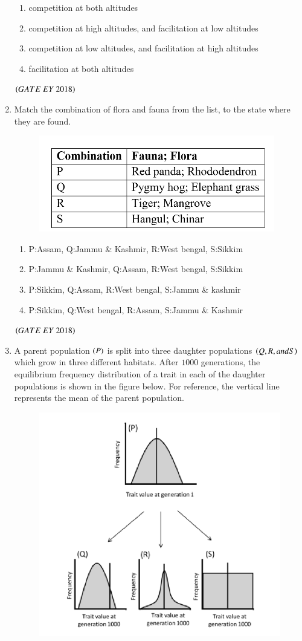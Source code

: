 \documentclass[journal]{IEEEtran}
\numberwithin{equation}{enumi}
\numberwithin{figure}{enumi}
\begin{document}
\begin{enumerate}
\begin{figure}[!ht]
    \caption{}
    \label{fig:3}
   \end{figure}
    \begin{enumerate}
        \item competition at both altitudes
        \item competition at high altitudes, and facilitation at low altitudes
        \item competition at low altitudes, and facilitation at high altitudes
        \item facilitation at both altitudes
    \end{enumerate}
    \hfill{$\brak{ GATE\ EY\ 2018}$}
    \bigskip
    \item Match the combination of flora and fauna from the list, to the state where they are
found.
\begin{figure}[!ht]
    \centering
    \includegraphics[width=0.5\columnwidth]{figs/4.png}
    \caption{}
    \label{fig:4}
   \end{figure}
    \begin{enumerate}
        \item P:Assam, Q:Jammu \& Kashmir, R:West bengal, S:Sikkim
        \item P:Jammu \& Kashmir, Q:Assam, R:West bengal, S:Sikkim
        \item P:Sikkim, Q:Assam, R:West bengal, S:Jammu \& kashmir
        \item P:Sikkim, Q:West bengal, R:Assam, S:Jammu \& Kashmir
    \end{enumerate}
    \hfill{$\brak{ GATE\ EY\ 2018}$}
    \bigskip
    \item A parent population $\left(P\right)$ is split into three daughter populations $\left(Q, R, and S\right)$ which
grow in three different habitats. After $1000$ generations, the equilibrium frequency
distribution of a trait in each of the daughter populations is shown in the figure
below. For reference, the vertical line represents the mean of the parent population.
\begin{figure}[!ht]
    \centering
    \includegraphics[width=0.6\columnwidth]{figs/6.png}

\end{figure}
\end{enumerate}
\end{document}
